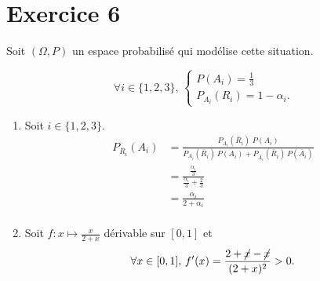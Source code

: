 \part{Exercice 6}

Soit $(\Omega, P)$ un espace probabilisé qui modélise cette situation.

\[
	\forall i \in \{1,2,3\},\,\begin{cases}
		P(A_i) = \frac{1}{3}\\[2mm]
		P_{A_i}(R_i) = 1 - \alpha_i.
	\end{cases}
\]

\begin{enumerate}
	\item Soit $i \in \{1,2,3\}$.
		\begin{align*}
			P_{\overline{R}_i}(A_i) &= \frac{P_{A_i}(\overline{R}_i)\;P(A_i)}{P_{A_i}(\overline{R}_i)\,P(A_i) + P_{\overline{A}_i}(\overline{R}_i)\,P(\overline{A}_i)} \\
			&= \frac{\frac{\alpha_i}{3}}{\frac{\alpha_i}{3} + \frac{2}{3}} \\
			&= \frac{\alpha_i}{2 + \alpha_i} \\
		\end{align*}
	\item Soit $f : x \mapsto \frac{x}{2+x}$ dérivable sur $[0,1]$ et \[
			\forall x \in [0,1],\,f'(x) = \frac{2 + \cancel{x} - \cancel{x}}{(2 + x)^2} > 0
		.\]
		\begin{center}
		\end{center}
\end{enumerate}

